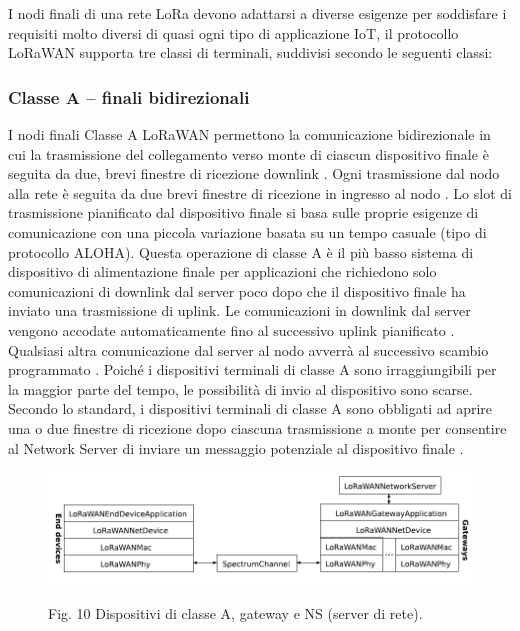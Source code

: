 \documentclass[a4paper]{report} %
\begin{document}
I nodi finali di una rete LoRa devono adattarsi a diverse esigenze per soddisfare i requisiti molto diversi di quasi ogni tipo di applicazione IoT, il protocollo LoRaWAN supporta tre classi di terminali, suddivisi secondo le seguenti classi:
\subsubsection{Classe A – finali bidirezionali}
I nodi finali Classe A LoRaWAN permettono la comunicazione bidirezionale \cite{art:rif.27} in cui la trasmissione del collegamento verso monte di ciascun dispositivo finale è seguita da due, brevi finestre di ricezione downlink \cite{art:rif.31}. Ogni trasmissione dal nodo alla rete è seguita da due brevi finestre di ricezione in ingresso al nodo \cite{art:rif.27}. Lo slot di trasmissione pianificato dal dispositivo finale si basa sulle proprie esigenze di comunicazione con una piccola variazione basata su un tempo casuale (tipo di protocollo ALOHA). Questa operazione di classe A è il più basso sistema di dispositivo di alimentazione finale per applicazioni che richiedono solo comunicazioni di downlink dal server poco dopo che il dispositivo finale ha inviato una trasmissione di uplink. Le comunicazioni in downlink dal server vengono accodate automaticamente fino al successivo uplink pianificato \cite{art:rif.31}. Qualsiasi altra comunicazione dal server al nodo avverrà al successivo scambio programmato \cite{art:rif.27}. Poiché i dispositivi terminali di classe A sono irraggiungibili per la maggior parte del tempo, le possibilità di invio al dispositivo sono scarse. Secondo lo standard, i dispositivi terminali di classe A sono obbligati ad aprire una o due finestre di ricezione dopo ciascuna trasmissione a monte per consentire al Network Server di inviare un messaggio potenziale al dispositivo finale \cite{art:rif.49}. 
\begin{figure}
\centering
\includegraphics[scale=.5]{Immagini/ClasseA.png}

Fig. 10 Dispositivi di classe A, gateway e NS (server di rete).
\end{figure}
\end{document}
